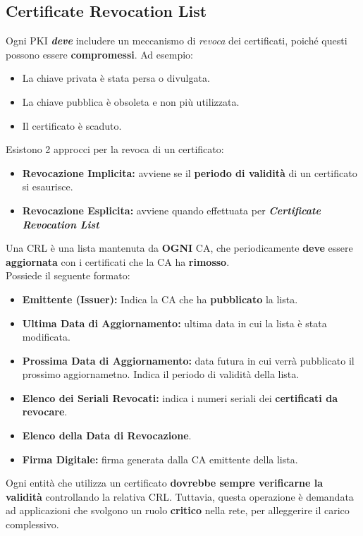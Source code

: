 \subsection{Certificate Revocation List}
Ogni PKI \textit{\textbf{deve}} includere un meccanismo di \textit{revoca} dei certificati, poiché questi possono essere \textbf{compromessi}. Ad esempio: 
\begin{itemize}
    \item La chiave privata è stata persa o divulgata.
    \item La chiave pubblica è obsoleta e non più utilizzata.
    \item Il certificato è scaduto.
\end{itemize}
Esistono 2 approcci per la revoca di un certificato:
\begin{itemize}
    \item \textbf{Revocazione Implicita:} avviene se il \textbf{periodo di validità} di un certificato si esaurisce.
    \item \textbf{Revocazione Esplicita:} avviene quando effettuata per \textbf{\textit{Certificate Revocation List}}
\end{itemize}
\begin{definition}
Una CRL è una lista mantenuta da \textbf{OGNI} CA, che periodicamente \textbf{deve} essere \textbf{aggiornata} con i certificati che la CA ha \textbf{rimosso}.\\
Possiede il seguente formato:
\begin{itemize}
    \item \textbf{Emittente (Issuer):} Indica la CA che ha \textbf{pubblicato} la lista.
    \item \textbf{Ultima Data di Aggiornamento:} ultima data in cui la lista è stata modificata.
    \item \textbf{Prossima Data di Aggiornamento:} data futura in cui verrà pubblicato il prossimo aggiornametno. Indica il periodo di validità della lista.
    \item \textbf{Elenco dei Seriali Revocati:} indica i numeri seriali dei \textbf{certificati da revocare}.
    \item \textbf{Elenco della Data di Revocazione}.
    \item \textbf{Firma Digitale:} firma generata dalla CA emittente della lista.
\end{itemize}
\end{definition}
\begin{remark}
Ogni entità che utilizza un certificato \textbf{dovrebbe sempre verificarne la validità} controllando la relativa CRL. Tuttavia, questa operazione è demandata ad applicazioni che svolgono un ruolo \textbf{critico} nella rete, per alleggerire il carico complessivo.
\end{remark}
